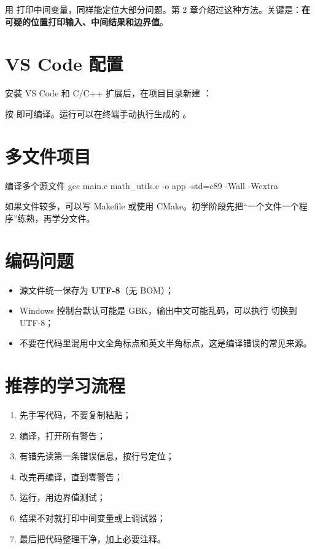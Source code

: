 \begin{tipbox}
用  打印中间变量，同样能定位大部分问题。第 2 章介绍过这种方法。关键是：\textbf{在可疑的位置打印输入、中间结果和边界值}。
\end{tipbox}

\section{VS Code 配置}

安装 VS Code 和 C/C++ 扩展后，在项目目录新建 ：


按  即可编译。运行可以在终端手动执行生成的 。

\section{多文件项目}

\begin{outbox}{编译多个源文件}
gcc main.c math_utils.c -o app -std=c89 -Wall -Wextra
\end{outbox}

如果文件较多，可以写 Makefile 或使用 CMake。初学阶段先把“一个文件一个程序”练熟，再学分文件。

\section{编码问题}

\begin{itemize}
  \item 源文件统一保存为 \textbf{UTF-8}（无 BOM）；
  \item Windows 控制台默认可能是 GBK，输出中文可能乱码，可以执行  切换到 UTF-8；
  \item 不要在代码里混用中文全角标点和英文半角标点，这是编译错误的常见来源。
\end{itemize}

\section{推荐的学习流程}

\begin{enumerate}
  \item 先手写代码，不要复制粘贴；
  \item 编译，打开所有警告；
  \item 有错先读第一条错误信息，按行号定位；
  \item 改完再编译，直到零警告；
  \item 运行，用边界值测试；
  \item 结果不对就打印中间变量或上调试器；
  \item 最后把代码整理干净，加上必要注释。
\end{enumerate}
